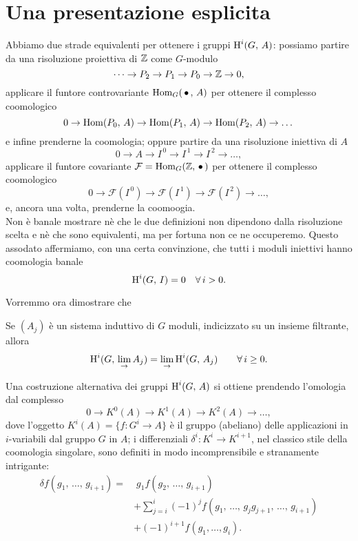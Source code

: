 \section{Una presentazione esplicita}
Abbiamo due strade equivalenti per ottenere i gruppi $ \operatorname{H}^i(G, \, A) $: possiamo partire da una risoluzione proiettiva di $ \mathbb{Z} $ come $ G $-modulo
\[ \dots \to P_2 \to P_1 \to P_0 \to \mathbb{Z} \to 0, \]
applicare il funtore controvariante $ \operatorname{Hom}_G(\, \bullet\,, \, A) $ per ottenere il complesso coomologico
\[ 0 \to \operatorname{Hom}(P_0, \, A) \to \operatorname{Hom}(P_1, \, A) \to \operatorname{Hom}(P_2, \, A) \to \dots \]
e infine prenderne la coomologia; oppure partire da una risoluzione iniettiva di $ A $
\[ 0 \to A \to I^{\,0} \to I^{\,1} \to I^{\,2} \to \dots, \]
applicare il funtore covariante $ \mathcal{F} = \operatorname{Hom}_G(\mathbb{Z}, \, \bullet \, ) $ per ottenere il complesso coomologico
\[ 0 \to \mathcal{F}\left(I^{\,0}\right) \to \mathcal{F}\left(I^{\,1}\right) \to \mathcal{F}\left(I^{\,2}\right) \to \dots, \]
e, ancora una volta, prenderne la coomoogia. \\

Non è banale mostrare nè che le due definizioni non dipendono dalla risoluzione scelta e nè che sono equivalenti, ma per fortuna non ce ne occuperemo. Questo assodato affermiamo, con una certa convinzione, che tutti i moduli iniettivi hanno coomologia banale
\begin{equation} \label{injban}
	\operatorname{H}^i(G, \, I) = 0 \quad \forall \, i > 0.
\end{equation}

Vorremmo ora dimostrare che
\begin{proposition} 
	Se $ (A_j) $ è un sistema induttivo di $ G $ moduli, indicizzato su un insieme filtrante, allora
	\[ \operatorname{H}^i(G, \, \lim_\rightarrow A_j) = \lim_\rightarrow \operatorname{H}^i(G, \, A_j) \qquad \forall \, i \geq 0. \] 
\end{proposition}

Una costruzione alternativa dei gruppi $ \operatorname{H}^i(G, \, A) $ si ottiene prendendo l'omologia dal complesso
\[ 0 \to K^0(A) \to K^1(A) \to K^2 (A) \to \dots, \]
dove l'oggetto $ K^i(A) = \{ f \colon G^i \to A\} $ è il gruppo (abeliano) delle applicazioni in $ i $-variabili dal gruppo $ G $ in $ A $; i differenziali $ \delta^i \colon K^i \to K^{i+1} $, nel classico stile della coomologia singolare, sono definiti in modo incomprensibile e stranamente intrigante:
\begin{align*}
	\delta f(g_1, \, \dots, \, g_{i+1}) = & \;  g_1 f(g_2, \, \dots, \, g_{i+1}) \\ & + \sum_{j = i}^{i} (-1)^j f(g_1, \, \dots, \, g_jg_{j+1}, \, \dots, \, g_{i+1}) \\ & + (-1)^{i+1} f(g_1, \dots, g_i).
\end{align*}

